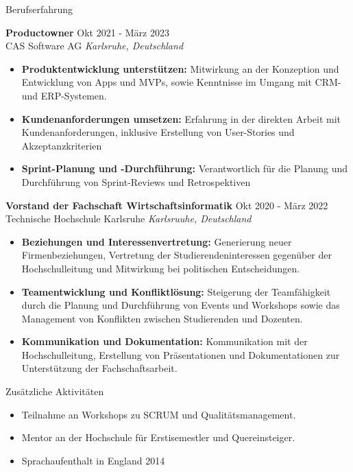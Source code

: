 \documentclass{resume} %
\begin{document}

\begin{rSection}{Berufserfahrung}

    \textbf{Productowner} \hfill Okt 2021 - März 2023\\
    CAS Software AG \hfill \textit{Karlsruhe, Deutschland}
    \begin{itemize}
        \itemsep -3pt {}
        \item \raggedright{\textbf{Produktentwicklung unterstützen:} Mitwirkung an der Konzeption und Entwicklung von Apps und MVPs, sowie Kenntnisse im Umgang mit CRM- und ERP-Systemen.}
        \item \raggedright{\textbf{Kundenanforderungen umsetzen:} Erfahrung in der direkten Arbeit mit Kundenanforderungen, inklusive Erstellung von User-Stories und Akzeptanzkriterien}
        \item \raggedright{\textbf{Sprint-Planung und -Durchführung:} Verantwortlich für die Planung und Durchführung von Sprint-Reviews und Retrospektiven}
    \end{itemize}

    \textbf{Vorstand der Fachschaft Wirtschaftsinformatik} \hfill Okt 2020 - März 2022\\
    Technische Hochschule Karlsruhe \hfill \textit{Karlsruuhe, Deutschland}
    \begin{itemize}
        \itemsep -3pt {}
        \item \raggedright{\textbf{Beziehungen und Interessenvertretung:} Generierung neuer Firmenbeziehungen, Vertretung der Studierendeninteressen gegenüber der Hochschulleitung und Mitwirkung bei politischen Entscheidungen.}
        \item \raggedright{\textbf{Teamentwicklung und Konfliktlösung:} Steigerung der Teamfähigkeit durch die Planung und Durchführung von Events und Workshops sowie das Management von Konflikten zwischen Studierenden und Dozenten.} 
        \item \raggedright{\textbf{Kommunikation und Dokumentation:} Kommunikation mit der Hochschulleitung, Erstellung von Präsentationen und Dokumentationen zur Unterstützung der Fachschaftsarbeit.}
    \end{itemize}
\end{rSection}

\begin{rSection}{Zusätzliche Aktivitäten}
    \begin{itemize}
        \item 	Teilnahme an Workshops zu SCRUM und Qualitätsmanagement.
        \item	Mentor an der Hochschule für Erstisemestler und Quereinsteiger.
        \item   Sprachaufenthalt in England 2014
    \end{itemize}


\end{rSection}
\end{document}
